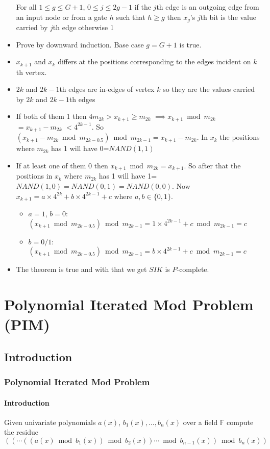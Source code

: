 \documentclass[article,8pt]{beamer}%
\newcommand{\bbF}{\mathbb{F}}
\begin{document}
\begin{frame}[allowframebreaks]
\begin{itemize}
	\begin{theorem}
		For all $1\leq g\leq G+1$, $0\leq j\leq 2g-1$ if the $j$th edge is an outgoing edge from an input node or from a gate $h$ such that $h\geq g$ then $x_g$'s $j$th bit is the value carried by $j$th edge 		otherwise 1
	\end{theorem}
	\item Prove by downward induction. Base case $g=G+1$ is true.
	\item $x_{k+1}$ and $x_k$ differs at the positions corresponding to the edges incident on $k$th vertex.
	\item $2k$ and $2k-1$th edges are in-edges of vertex $k$ so they are the values carried by $2k$ and $2k-1$th edges
	\item If both of them 1 then $4m_{2k}>x_{k+1}\geq m_{2k}$ $\implies x_{k+1}\bmod{m_{2k}}$ $=x_{k+1}-m_{2k}$ $<4^{2k-1}$. So $(x_{k+1}-m_{2k}\bmod{m_{2k-0.5}})\bmod{m_{2k-1}}=x_{k+1}-m_{2k}$. In $x_k$ the positions where $m_{2k}$ has 1 will have 0=$NAND(1,1)$
	\item If at least one of them 0 then $x_{k+1}\bmod{m_{2k}}=x_{k+1}$. So after that the positions in $x_k$ where $m_{2k}$ has 1 will have 1=$NAND(1,0)=NAND(0,1)=NAND(0,0)$. Now $x_{k+1}=a\times 4^{2k}+b\times 4^{2k-1}+c$ where $a,b\in \{0,1\}$. \begin{itemize}
		\item $a=1$, $b=0$: $(x_{k+1}\bmod{m_{2k-0.5}})\bmod{m_{2k-1}}=1\times 4^{2k-1}+c\bmod{m_{2k-1}}=c$
		\item $b=0/1$: $(x_{k+1}\bmod{m_{2k-0.5}})\bmod{m_{2k-1}}=b\times 4^{2k-1}+c\bmod{m_{2k-1}}=c$
	\end{itemize}
	\item The theorem is true and with that we get $SIK$ is $P$-complete.
\end{itemize}
\end{frame}

\section{Polynomial Iterated Mod Problem (PIM)}
\subsection{Introduction}
\begin{frame}
\frametitle{Polynomial Iterated Mod Problem}
\framesubtitle{Introduction}
\begin{definition}
	Given univariate polynomials $a(x)$, $b_1(x),\dots, b_n(x)$ over a field $\bbF$ compute the residue $((\cdots ((a(x)\bmod{b_1(x)})\bmod{b_2(x)})\cdots\bmod{b_{n-1}(x)})\bmod{b_{n}(x)})$
\end{definition}
\end{frame}
\end{document}
